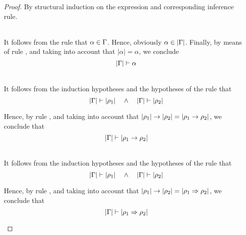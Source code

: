 \begin{proof}
By structural induction on the expression and corresponding inference rule.
\begin{description}
\renewcommand{\itemsep}{10mm}
\item[\fbox{\texttt{(WF-VarTy)}}\quad$\tenv \turns \alpha$] \ \\
  It follows from the rule that $\alpha \in \Gamma$. Hence, obviously $\alpha
  \in |\Gamma|$. Finally, by means of rule , and taking into account
  that $|\alpha| = \alpha$, we conclude
\begin{equation*}
  |\Gamma| \vdash \alpha
\end{equation*}

\item[\fbox{\texttt{(WF-FunTy)}}\quad$\tenv \turns \rulet_1 \arrow \rulet_2$] \ \\
  It follows from the induction hypotheses and the hypotheses of the rule that
\begin{equation*}
  |\Gamma| \vdash |\rho_1| \quad \wedge \quad |\Gamma| \vdash |\rho_2|
\end{equation*}

  Hence, by rule , and taking into account that
  $|\rho_1| \rightarrow |\rho_2| = |\rho_1 \rightarrow \rho_2|$, we conclude that
\begin{equation*}
  |\Gamma| \vdash |\rho_1 \rightarrow \rho_2|
\end{equation*}

\item[\fbox{\texttt{(WF-RulTy)}}\quad$\tenv \turns \rulet_1 \iarrow \rulet_2$] \ \\
  It follows from the induction hypotheses and the hypotheses of the rule that
\begin{equation*}
  |\Gamma| \vdash |\rho_1| \quad \wedge \quad |\Gamma| \vdash |\rho_2|
\end{equation*}

  Hence, by rule , and taking into account that
  $|\rho_1| \rightarrow |\rho_2| = |\rho_1 \Rightarrow \rho_2|$, we conclude that
\begin{equation*}
  |\Gamma| \vdash |\rho_1 \Rightarrow \rho_2|
\end{equation*}


\end{description}
\end{proof}
